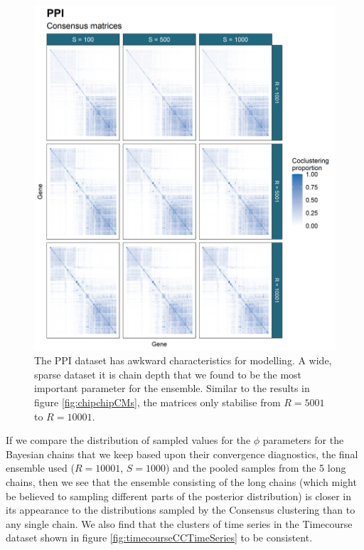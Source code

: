 \documentclass[]{article}
\begin{document}
\begin{figure}
	\centering
	\includegraphics[scale=0.8]{./Images/Yeast/PPICMcomparison.png}
	\caption{The PPI dataset has awkward characteristics for modelling. A wide, sparse dataset it is chain depth that we found to be the most important parameter for the ensemble. Similar to the results in figure \ref{fig:chipchipCMs}, the matrices only stabilise from $R=5001$ to $R=10001$.}
	\label{fig:ppiCMs}
\end{figure}

If we compare the distribution of sampled values for the $\phi$ parameters for the Bayesian chains that we keep based upon their convergence diagnostics, the final ensemble used ($R=10001$, $S=1000$) and the pooled samples from the 5 long chains, then we see that the ensemble consisting of the long chains (which might be believed to sampling different parts of the posterior distribution) is closer in its appearance to the distributions sampled by the Consensus clustering than to any single chain. We also find that the clusters of time series in the Timecourse dataset shown in figure \ref{fig:timecourseCCTimeSeries} to be consistent.
\end{document}
